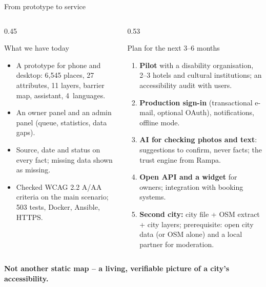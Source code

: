 \begin{frame}{From prototype to service}
  \begin{columns}[T,onlytextwidth]
    \begin{column}{0.45\textwidth}
      \begin{exampleblock}{What we have today}
        \footnotesize
        \begin{itemize}
          \item A prototype for phone and desktop: 6,545 places, 27 attributes, 11 layers, barrier map, assistant, 4~languages.
          \item An owner panel and an admin panel (queue, statistics, data gaps).
          \item Source, date and status on every fact; missing data shown as missing.
          \item Checked WCAG 2.2 A/AA criteria on the main scenario; 503 tests, Docker, Ansible, HTTPS.
        \end{itemize}
      \end{exampleblock}
    \end{column}
    \begin{column}{0.53\textwidth}
      \begin{block}{Plan for the next 3--6 months}
        \footnotesize
        \begin{enumerate}
          \item \textbf{Pilot} with a disability organisation, 2--3 hotels and cultural institutions;
                an accessibility audit with users.
          \item \textbf{Production sign-in} (transactional e-mail, optional OAuth), notifications, offline mode.
          \item \textbf{AI for checking photos and text}: suggestions to confirm, never facts; the trust engine from Rampa.
          \item \textbf{Open API and a widget} for owners; integration with booking systems.
          \item \textbf{Second city:} city file + OSM extract + city layers; prerequisite: open city data (or OSM alone)
                and a local partner for moderation.
        \end{enumerate}
      \end{block}
    \end{column}
  \end{columns}
  \vspace{1.5mm}
  \centering
  {\bfseries\color{accNavy}Not another static map -- a living, verifiable picture of a city's accessibility.\par}
  \vspace{0.8mm}


\end{frame}
